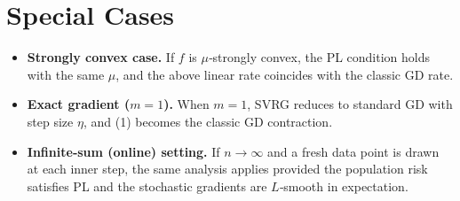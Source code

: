 \documentclass{article}
\begin{document}
\section*{Special Cases}
\begin{itemize}
\item \textbf{Strongly convex case.} If $f$ is $\mu$‑strongly convex, the PL condition holds with the same $\mu$, and the above linear rate coincides with the classic GD rate.
\item \textbf{Exact gradient ($m=1$).} When $m=1$, SVRG reduces to standard GD with step size $\eta$, and (1) becomes the classic GD contraction.
\item \textbf{Infinite‑sum (online) setting.} If $n\to\infty$ and a fresh data point is drawn at each inner step, the same analysis applies provided the population risk satisfies PL and the stochastic gradients are $L$‑smooth in expectation.
\end{itemize}
\end{document}
